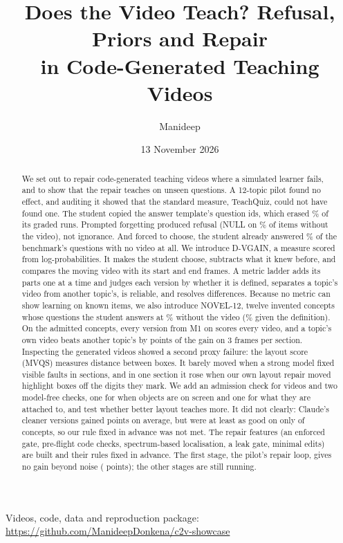 \documentclass[10pt,twocolumn]{article}
\title{Does the Video Teach? Refusal, Priors and Repair\\in Code-Generated Teaching Videos}
\author{Manideep}
\date{13 November 2026}
\begin{document}
\maketitle
\begin{center}\small Videos, code, data and reproduction package: \url{https://github.com/ManideepDonkena/c2v-showcase}\end{center}

\begin{abstract}
We set out to repair code-generated teaching videos where a simulated learner fails, and to show that the repair
teaches on unseen questions. A 12-topic pilot found no effect, and auditing it showed that the standard measure,
TeachQuiz, could not have found one. The student copied the answer template's question ids, which erased
\OrderShare\% of its graded runs. Prompted forgetting produced refusal (NULL on \NullNoVideo\% of items without the
video), not ignorance. And forced to choose, the student already answered \mmmcpriorGemmaAcc\% of the benchmark's
questions with no video at all. We introduce D-VGAIN, a measure scored from log-probabilities. It makes the student choose,
subtracts what it knew before, and compares the moving video with its start and end frames. A metric ladder adds its parts one at a time and judges each version by whether it is
defined, separates a topic's video from another topic's, is reliable, and resolves differences. Because no metric can
show learning on known items, we also introduce NOVEL-12, twelve invented concepts whose questions the student
answers at \novelpriorGemmaAcc\% without the video (\novelcardGemmaAcc\% given the definition). On the
\LadNovelTopics{} admitted concepts, every version from M1 on scores every video, and a topic's own video beats
another topic's by \LadNovelSepNine{} points of the gain on 3 frames per section. Inspecting the generated videos
showed a second proxy failure: the layout score (MVQS) measures distance between boxes. It barely moved when a strong
model fixed \ClaudeFaults{} visible faults in \ClaudeSections{} sections, and in one section it rose when our own
layout repair moved highlight boxes off the digits they mark. We add an admission check for videos and two model-free checks, one for
when objects are on screen and one for what they are attached to, and test whether better layout teaches more. It did not clearly: Claude's cleaner versions
gained \LSDiff{} points on average, but were at least as good on only \LSWins{} of \LSN{} concepts, so our rule fixed in advance
was not met. The
repair features (an enforced gate, pre-flight code checks, spectrum-based localisation, a leak gate, minimal edits)
are built and their rules fixed in advance. The first stage, the pilot's repair loop, gives no gain beyond noise
(\NMRepair{} points); the other stages are still running.
\end{abstract}














\end{document}
